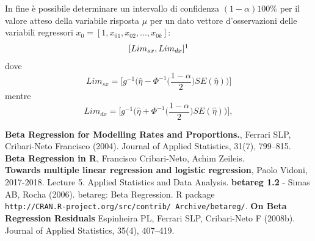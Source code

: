 \documentclass[twoside,twocolumn]{article}
\begin{document}
In fine è possibile determinare un intervallo di confidenza $(1-\alpha)100\%$ per il valore atteso della variabile risposta $\mu$ per un dato vettore d'osservazioni delle variabili regressori $x_0=[1,x_{01},x_{02},...,x_{0k}]$:
$$[Lim_{sx}, Lim_{dx}]\footnote{Tale intervallo è valido solo per funzioni di collegamento $g(\cdot)$ strettamente crescenti.}$$ dove 
$$Lim_{sx}=\bigg[ g^{-1}\bigg(\hat{\eta} -\Phi^{-1}\Big(\frac{1-\alpha}{2}\Big)SE(\hat{\eta})\bigg)  \bigg]  $$
mentre
$$ Lim_{dx}=\bigg[ g^{-1}\bigg(\hat{\eta} +\Phi^{-1}\Big(\frac{1-\alpha}{2}\Big)SE(\hat{\eta})\bigg)  \bigg], $$
\newpage
\tableofcontents
		\begin{thebibliography}{99} 
	 \textbf{Beta Regression for Modelling Rates and Proportions.}, Ferrari SLP, Cribari-Neto Francisco (2004).  Journal of Applied Statistics, 31(7), 799–815.
	 \textbf{Beta Regression in R}, Francisco Cribari-Neto, Achim Zeileis.\\
	 \textbf{Towards multiple linear regression and logistic regression}, Paolo Vidoni, 2017-2018. Lecture 5. Applied Statistics and Data Analysis.
	\textbf{betareg 1.2} - Simas AB, Rocha (2006). betareg: Beta Regression. R package \\ \texttt{http://CRAN.R-project.org/src/contrib/ Archive/betareg/}.
	\textbf{On Beta Regression Residuals} Espinheira PL, Ferrari SLP, Cribari-Neto F (2008b). Journal
of Applied Statistics, 35(4), 407–419.
	\end{thebibliography}
\end{document}
